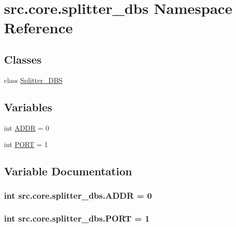 \hypertarget{namespacesrc_1_1core_1_1splitter__dbs}{}\section{src.\+core.\+splitter\+\_\+dbs Namespace Reference}
\label{namespacesrc_1_1core_1_1splitter__dbs}
\subsection*{Classes}
\begin{DoxyCompactItemize}
\item 
class \hyperlink{classsrc_1_1core_1_1splitter__dbs_1_1Splitter__DBS}{Splitter\+\_\+\+D\+B\+S}
\end{DoxyCompactItemize}
\subsection*{Variables}
\begin{DoxyCompactItemize}
\item 
int \hyperlink{namespacesrc_1_1core_1_1splitter__dbs_a9440029dc6660f9154c0dcfe6781ad94}{A\+D\+D\+R} = 0
\item 
int \hyperlink{namespacesrc_1_1core_1_1splitter__dbs_a7d403b62d21ee85e589337afeaf521a5}{P\+O\+R\+T} = 1
\end{DoxyCompactItemize}


\subsection{Variable Documentation}
\hypertarget{namespacesrc_1_1core_1_1splitter__dbs_a9440029dc6660f9154c0dcfe6781ad94}{}
\subsubsection[{A\+D\+D\+R}]{\setlength{\rightskip}{0pt plus 5cm}int src.\+core.\+splitter\+\_\+dbs.\+A\+D\+D\+R = 0}\label{namespacesrc_1_1core_1_1splitter__dbs_a9440029dc6660f9154c0dcfe6781ad94}
\hypertarget{namespacesrc_1_1core_1_1splitter__dbs_a7d403b62d21ee85e589337afeaf521a5}{}
\subsubsection[{P\+O\+R\+T}]{\setlength{\rightskip}{0pt plus 5cm}int src.\+core.\+splitter\+\_\+dbs.\+P\+O\+R\+T = 1}\label{namespacesrc_1_1core_1_1splitter__dbs_a7d403b62d21ee85e589337afeaf521a5}
